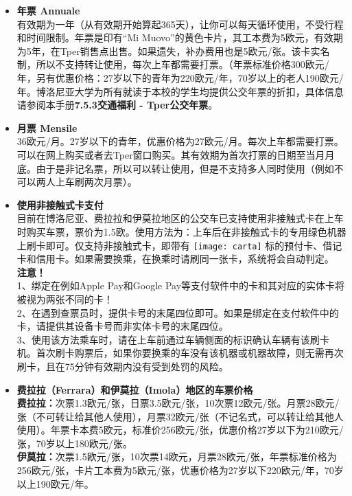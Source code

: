 \begin{itemize}
\item  \textbf{年票 Annuale}\\
有效期为一年（从有效期开始算起365天），让你可以每天循环使用，不受行程和时间限制。年票是印有“Mi Muovo”的黄色卡片，其工本费为5欧元，有效期为5年，在Tper销售点出售。如果遗失，补办费用也是5欧元/张。该卡实名制，所以不支持转让使用，每次上车都需要打票。（年票标准价格300欧元/年，另有优惠价格：27岁以下的青年为220欧元/年，70岁以上的老人190欧元/年。博洛尼亚大学为所有就读于本校的学生均提供公交年票的折扣，具体信息请参阅本手册\textbf{7.5.3交通福利 - Tper公交年票}。
\item  \textbf{月票 Mensile}\\
36欧元/月。27岁以下的青年，优惠价格为27欧元/月。每次上车都需要打票。可以在网上购买或者去Tper窗口购买。其有效期为首次打票的日期至当月月底。由于是非记名票，所以可以转让使用，但是不支持多人同时使用（例如不可以两人上车刷两次月票）。
\item  \textbf{使用非接触式卡支付}\\
目前在博洛尼亚、费拉拉和伊莫拉地区的公交车已支持使用非接触式卡在上车时购买车票，票价为1.5欧。使用方法为：上车后在非接触式卡的专用绿色机器上刷卡即可。仅支持非接触式卡，即带有 \texttt{[image: carta]} 标的预付卡、借记卡和信用卡。如果需要换乘，在换乘时请刷同一张卡，系统将会自动判定。\\
\textbf{注意！}\\
1、绑定在例如Apple Pay和Google Pay等支付软件中的卡和其对应的实体卡将被视为两张不同的卡！\\
2、在遇到查票员时，提供卡号的末尾四位即可。如果是绑定在支付软件中的卡，请提供其设备卡号而非实体卡号的末尾四位。\\
3、使用该方法乘车时，请在上车前通过车辆侧面的标识确认车辆有该刷卡机。首次刷卡购票后，如果你要换乘的车没有该机器或机器故障，则无需再次刷卡，且在75分钟有效期内没有受到处罚的风险。
\item  \textbf{费拉拉（Ferrara）和伊莫拉（Imola）地区的车票价格}\\
\textbf{费拉拉：}次票1.3欧元/张，日票3.5欧元/张，10次票12欧元/张。月票28欧元/张（不可转让给其他人使用），月票32欧元/张（不记名式，可以转让给其他人使用）。年票卡本费5欧元，标准价256欧元/张，优惠价格27岁以下为210欧元/张，70岁以上180欧元/张。\\
\textbf{伊莫拉：}次票1.5欧元/张，10次票14欧元，月票28欧元/张，年票标准价格为256欧元/张，卡片工本费为5欧元/张，优惠价格为27岁以下220欧元/年，70岁以上190欧元/年。



\end{itemize}

